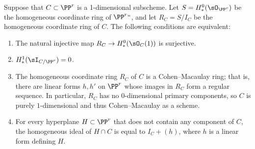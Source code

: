 \begin{proposition}\label{ACM basics}
Suppose that $C\subset \PP^r$ is a 1-dimensional subscheme. Let $S = H^0_*(\sO_{\PP^r})$
be the homogeneous coordinate ring of $\PP^r` `$, and let $R_C = S/I_C$ be the homogeneous
coordinate ring of $C$. The following conditions are equivalent:
\begin{enumerate}

 \item The natural injective map $R_C \to H^0_*(\sO_{C}(1))$ is surjective.

\item $H^1_*(\sI_{C/\PP^r}) = 0$.

\item The homogeneous coordinate ring $R_C$ of $C$ is a Cohen--Macaulay ring; that is, there are linear forms $h,h'$ on $\PP^r$ whose images in  $R_C$ form a regular sequence. In particular, $R_C$ has no $0$-dimensional primary components,
so $C$ is purely $1$-dimensional and thus Cohen--Macaulay as a scheme.
%

 \item For every hyperplane $H\subset \PP^r$ that does not contain any component of $C$,
 the homogeneous ideal of $H\cap C$
 is equal to  $I_C+(h)$, where $h$ is a linear form defining $H$.
\end{enumerate}
\end{proposition}

